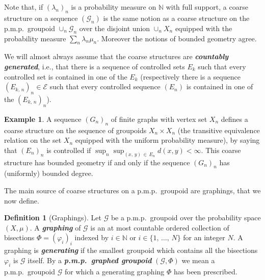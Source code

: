 \documentclass[10pt]{amsart}
\theoremstyle{definition}
\newtheorem{defi}[cdrthm]{Definition}
\newtheorem{exam}[cdrthm]{Example}
\newcommand{\defin}[1]{\textbf{\emph{#1}}}
\newcommand{\Nmath}{\mathbb{N}}
\newcommand{\coarse}{\mathcal{E}}
\newcommand{\cg}{\mathcal{G}}
\newcommand{\ph}{\varphi}
\newcommand{\pmp}{p.m.p.\ }
\begin{document}
Note that, if $(\lambda_n)_n$ is a probability measure on $\Nmath$ with full support, a coarse structure on a sequence $(\cg_n)$ is the same notion as a coarse structure on the \pmp groupoid $\cup_n \cg_n$ over the disjoint union $\cup_n X_n$ equipped with the probability measure $\sum_n \lambda_n \mu_n$. Moreover the notions of bounded geometry agree.

We will almost always assume that the coarse structures are
\defin{countably generated}, i.e., that there is a sequence of controlled sets $E_k$ such that every controlled set is contained in one of the $E_k$ (respectively there is a sequence $(E_{k,\,n})_n \in \coarse$ such that every controlled sequence $(E_n)$ is contained in one of the $(E_{k,\,n})_n$).

\begin{exam}\label{ex:coarse_structure_on_graphs}
A sequence $(G_n)_n$ of finite graphs with vertex set $X_n$ defines a coarse structure on the sequence of groupoids $X_n \times X_n$ (the transitive equivalence relation on the set $X_n$ equipped with the uniform probability measure), by saying that $(E_n)_n$ is controlled if $\sup_n \sup_{(x,\,y)\,\in\,E_n} d(x,y)< \infty$. This coarse structure has bounded geometry if and only if the sequence $(G_n)_n$ has (uniformly) bounded degree.
\end{exam}


The main source of coarse structures on a \pmp groupoid are graphings, that we now define.

\begin{defi}[Graphings]\label{dfn:graphing}
Let $\cg$ be a \pmp groupoid over the probability space $(X,\mu)$. A \defin{graphing} of $\cg$ is an at most countable ordered collection of bisections $\Phi=(\ph_i)_i$ indexed by $i \in \Nmath$ or $i \in \{1,\,\dots,\,N\}$ for an integer $N$. A graphing is \defin{generating} if the smallest groupoid which contains all the bisections $\ph_i$ is $\cg$ itself. By a
\defin{\pmp graphed groupoid} $(\cg,\Phi)$ we mean a \pmp groupoid $\cg$ for which a generating graphing $\Phi$ has been prescribed.
\end{defi}
\end{document}

